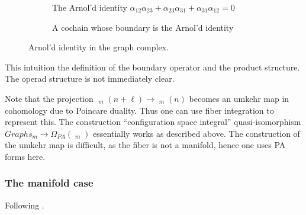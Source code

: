 \documentclass{scrartcl}
\theoremstyle{plain}
\theoremstyle{definition}
\DeclareMathOperator{\cConf}{\overline{Conf}}
\begin{document}
\begin{figure}[ht]
    \centering
    \begin{subfigure}[b]{0.65\textwidth}
        \centering
        
        \caption{The Arnol'd identity $\alpha_{12}\alpha_{23} + \alpha_{23}\alpha_{31} + \alpha_{31}\alpha_{12} = 0$}
    \end{subfigure}
    \hfill
    \begin{subfigure}[b]{0.3\textwidth}
        \centering
        
        \caption{A cochain whose boundary is the Arnol'd identity}
    \end{subfigure} 
    \caption{Arnol'd identity in the graph complex. }\label{graph-complex-ex}
\end{figure}

This intuition the definition of the boundary operator and the product structure. The operad structure is not immediately clear. 

Note that the projection $\cConf_m(n+\ell) \to \cConf_m(n)$ becomes an umkehr map in cohomology due to Poincare duality. Thus one can use fiber integration to represent this. The construction ``configuration space integral'' quasi-isomorphism $Graphs_m \to \Omega_{PA}(\cConf_m)$ essentially works as described above. The construction of the umkehr map is difficult, as the fiber is not a manifold, hence one uses PA forms here. 

\subsubsection{The manifold case}

Following \cite{campos2016model}. 



\end{document}
